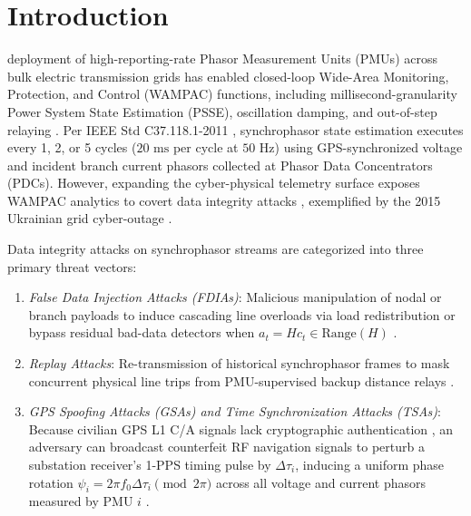 \documentclass[journal,twoside]{IEEEtran}
\begin{document}
\section{Introduction}
 deployment of high-reporting-rate Phasor Measurement Units (PMUs) across bulk electric transmission grids has enabled closed-loop Wide-Area Monitoring, Protection, and Control (WAMPAC) functions, including millisecond-granularity Power System State Estimation (PSSE), oscillation damping, and out-of-step relaying \cite{whitehead2017ukraine,govindarasu2012cyber,ashok2017cyber,terzija2011wide}. Per IEEE Std C37.118.1-2011 \cite{ieeec37118}, synchrophasor state estimation executes every 1, 2, or 5 cycles ($20\text{~ms}$ per cycle at $50\text{~Hz}$) using GPS-synchronized voltage and incident branch current phasors collected at Phasor Data Concentrators (PDCs). However, expanding the cyber-physical telemetry surface exposes WAMPAC analytics to covert data integrity attacks \cite{govindarasu2012cyber,ashok2017cyber}, exemplified by the 2015 Ukrainian grid cyber-outage \cite{whitehead2017ukraine}.

Data integrity attacks on synchrophasor streams are categorized into three primary threat vectors:
\begin{enumerate}
    \item \emph{False Data Injection Attacks (FDIAs)}: Malicious manipulation of nodal or branch payloads to induce cascading line overloads via load redistribution \cite{haridas2025novel} or bypass residual bad-data detectors when $a_t = H c_t \in \mathrm{Range}(H)$ \cite{deng2017false}.
    \item \emph{Replay Attacks}: Re-transmission of historical synchrophasor frames to mask concurrent physical line trips from PMU-supervised backup distance relays \cite{minal2020realtime,minal2019pmu}.
    \item \emph{GPS Spoofing Attacks (GSAs) and Time Synchronization Attacks (TSAs)}: Because civilian GPS L1 C/A signals lack cryptographic authentication \cite{warner2002simple,sinha2025explained}, an adversary can broadcast counterfeit RF navigation signals to perturb a substation receiver's 1-PPS timing pulse by $\Delta\tau_i$, inducing a uniform phase rotation $\psi_i = 2\pi f_0 \Delta\tau_i \pmod{2\pi}$ across all voltage and current phasors measured by PMU $i$ \cite{jiang2013spoofing,zhang2013time}.
\end{enumerate}
\end{document}
